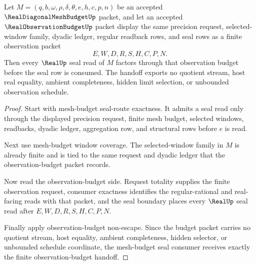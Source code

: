 \begin{theorem}
\label{thm:real-diagonal-mesh-budget-observation-budget-handoff}
Let $M=(q,b,\omega,\rho,\delta,\theta,e,h,c,p,n)$ be an accepted $\RealDiagonalMeshBudgetUp$ packet, and let an accepted $\RealObservationBudgetUp$ packet display the same precision request, selected-window family, dyadic ledger, regular readback rows, and seal rows as a finite observation packet
$$
E,W,D,R,S,H,C,P,N.
$$
Then every $\RealUp$ seal read of $M$ factors through that observation budget before the seal row is consumed. The handoff exports no quotient stream, host real equality, ambient completeness, hidden limit selection, or unbounded observation schedule.
\end{theorem}
\begin{proof}
Start with mesh-budget seal-route exactness. It admits a seal read only through the displayed precision request, finite mesh budget, selected windows, readbacks, dyadic ledger, aggregation row, and structural rows before $e$ is read.

Next use mesh-budget window coverage. The selected-window family in $M$ is already finite and is tied to the same request and dyadic ledger that the observation-budget packet records.

Now read the observation-budget side. Request totality supplies the finite observation request, consumer exactness identifies the regular-rational and real-facing reads with that packet, and the seal boundary places every $\RealUp$ seal read after $E,W,D,R,S,H,C,P,N$.

Finally apply observation-budget non-escape. Since the budget packet carries no quotient stream, host equality, ambient completeness, hidden selector, or unbounded schedule coordinate, the mesh-budget seal consumer receives exactly the finite observation-budget handoff.
\end{proof}

